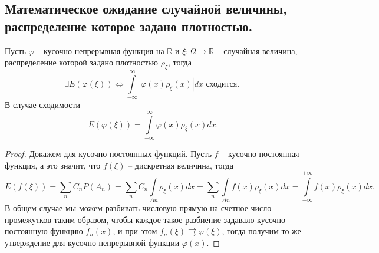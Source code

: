 \subsection{Математическое ожидание случайной величины, распределение которое задано плотностью.}
\begin{theorem}
    Пусть $\varphi$ -- кусочно-непрерывная функция на $\mathbb{R}$ и $\xi : \Omega \to \mathbb{R}$ -- случайная величина, распределение которой задано плотностью $\rho_\xi$, тогда 
    \[
        \exists E(\varphi(\xi))
        \Leftrightarrow
        \int \limits_{-\infty}^{\infty} |\varphi(x) \rho_\xi(x) | dx
        \text{ сходится. }
    \]
    В случае сходимости
    \[
        E(\varphi(\xi)) = \int \limits_{-\infty}^{\infty} \varphi(x) \rho_\xi(x) dx.
    \]
    \begin{proof}
        Докажем для кусочно-постоянных функций. Пусть $f$ -- кусочно-постоянная функция, а это значит, что $f(\xi)$ -- дискретная величина, тогда
        \[
            E(f(\xi)) =
            \sum_n C_n P(A_n) =
            \sum_n C_n \int \limits_{\Delta n} \rho_\xi(x) dx =
            \sum_n \int \limits_{\Delta n} f(x) \rho_\xi(x) dx =
            \int \limits_{-\infty}^{+\infty} f(x) \rho_\xi(x) dx.
        \]
        В общем случае мы можем разбивать числовую прямую на счетное число промежутков таким образом, чтобы каждое такое разбиение задавало кусочно-постоянную функцию $f_n(x)$, и при этом $f_n(\xi) \rightrightarrows \varphi(\xi)$, тогда получим то же утверждение для кусочно-непрерывной функции $\varphi(x)$.
    \end{proof}
\end{theorem}